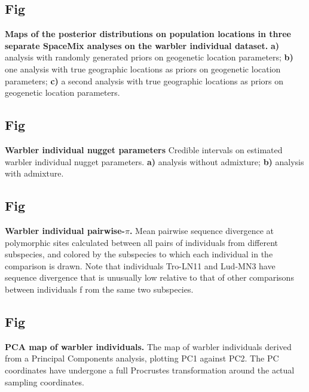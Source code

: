 \documentclass[10pt,letterpaper]{article}
\begin{document}
\subsection{Fig}
\label{sfig:warb_ind_clouds}
{\bf{
Maps of the posterior distributions on population locations in three separate SpaceMix analyses on the warbler individual dataset.}} 
	\textbf{a)}
		analysis with randomly generated priors on geogenetic location parameters; 
	\textbf{b)}
		one analysis with true geographic locations as priors on geogenetic location parameters; 
	\textbf{c)}
		a second analysis with true geographic locations as priors on geogenetic location parameters.

\subsection{Fig}
\label{sfig:warb_ind_nugg}
{\bf{
Warbler individual nugget parameters}}
Credible intervals on estimated warbler individual nugget parameters.
\textbf{a)} analysis without admixture; 
\textbf{b)} analysis with admixture.

\subsection{Fig}
\label{sfig:warb_ind_pwp}
{\bf{
Warbler individual pairwise-$\pi$.}}
Mean pairwise sequence divergence at polymorphic sites 
calculated between all pairs of individuals from different subspecies, 
and colored by the subspecies to which each individual in the comparison is drawn.  
Note that individuals Tro-LN11 and Lud-MN3 have sequence divergence 
that is unusually low relative to that of other comparisons between individuals f
rom the same two subspecies.

\subsection{Fig}
\label{sfig:warb_ind_PC_map}
{\bf{
PCA map of warbler individuals.}}
The map of warbler individuals derived from a Principal Components analysis,
plotting PC1 against PC2.
The PC coordinates have undergone a full Procrustes transformation 
around the actual sampling coordinates.
\end{document}
